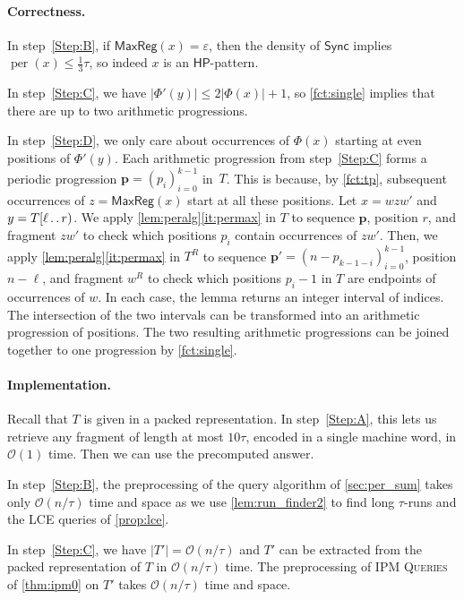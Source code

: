 \documentclass[a4paper]{article}
\theoremstyle{definition}
\theoremstyle{remark}
\newcommand{\IPM}{\textsc{IPM Queries}\xspace}
\newcommand{\HP}{\mathsf{HP}}
\newcommand{\dd}{\mathinner{\ldotp\ldotp}}
\DeclareMathOperator{\per}{per}
\newcommand{\MaxReg}{\mathsf{MaxReg}}
\newcommand{\Oh}{\mathcal{O}}
\renewcommand{\S}{\mathsf{Sync}}
\renewcommand{\S}{\mathsf{Sync}}
\begin{document}
\paragraph*{Correctness.}
In step~\ref{Step:B}, if $\MaxReg(x)=\varepsilon$, then the density of $\S$ implies $\per(x)\le \frac13\tau$, so indeed $x$ is an $\HP$-pattern.

In step~\ref{Step:C}, we have $|\Phi'(y)| \le 2|\Phi(x)|+1$, so \cref{fct:single} implies that there are up to two arithmetic progressions.

In step~\ref{Step:D}, we only care about occurrences of $\Phi(x)$ starting at even positions of $\Phi'(y)$.
Each arithmetic progression from step~\ref{Step:C} forms a periodic progression $\mathbf{p}=(p_i)_{i=0}^{k-1}$ in~$T$.
This is because, by \cref{fct:tp}, subsequent occurrences of $z=\MaxReg(x)$ start at all these positions.
Let $x=w z w'$ and $y=T[\ell \dd r)$.
We apply \cref{lem:peralg}\ref{it:permax} in $T$ to sequence $\mathbf{p}$, position $r$, and fragment $zw'$ to check which positions $p_i$ contain occurrences of $zw'$.
Then, we apply \cref{lem:peralg}\ref{it:permax} in $T^R$ to sequence
$\mathbf{p}'=(n-p_{k-1-i})_{i=0}^{k-1}$, position $n-\ell$, and fragment $w^R$
to check which positions $p_i-1$ in $T$ are endpoints of occurrences of $w$.
In each case, the lemma returns an integer interval of indices.
The intersection of the two intervals can be transformed into an arithmetic progression of positions.
The two resulting arithmetic progressions can be joined together to one progression by \cref{fct:single}.

\paragraph*{Implementation.}
Recall that $T$ is given in a packed representation.
In step~\ref{Step:A}, this lets us retrieve any fragment of length at most $10\tau$, encoded in a single machine word, in $\Oh(1)$ time.
Then we can use the precomputed answer.

In step~\ref{Step:B}, the preprocessing of the query algorithm of \cref{sec:per_sum} takes only $\Oh(n/\tau)$ time and space as we use \cref{lem:run_finder2} to find long $\tau$-runs and the LCE queries of \cref{prop:lce}.

In step~\ref{Step:C}, we have $|T'|=\Oh(n/\tau)$ and $T'$ can be extracted from the packed representation of $T$ in $\Oh(n/\tau)$ time.
The preprocessing of \IPM of \cref{thm:ipm0} on $T'$ takes $\Oh(n/\tau)$ time and space.
\end{document}
